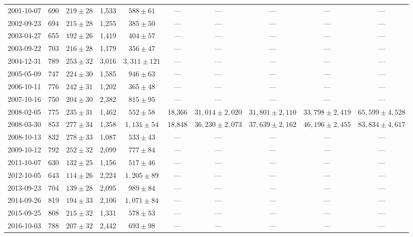 \begin{landscape}
\begin{longtable}{cccccccccc}
{2001-10-07} & 690 & {$219  \pm  28$} & 1,533 & {$588 \pm 61$} & --- & --- & --- & --- & --- \\
{2002-09-23} & 694 & {$215  \pm  28$} & 1,255 & {$385 \pm 50$} & --- & --- & --- & --- & --- \\
{2003-04-27} & 655 & {$192  \pm  26$} & 1,419 & {$404 \pm 57$} & --- & --- & --- & --- & --- \\
{2003-09-22} & 703 & {$216  \pm  28$} & 1,179 & {$356 \pm 47$} & --- & --- & --- & --- & --- \\
{2004-12-31} & 789 & {$253  \pm  32$} & 3,016 & {$3,311 \pm 121$} & --- & --- & --- & --- & --- \\
{2005-05-09} & 747 & {$224  \pm  30$} & 1,585 & {$946 \pm 63$} & --- & --- & --- & --- & --- \\
{2006-10-11} & 776 & {$242  \pm  31$} & 1,202 & {$365 \pm 48$} & --- & --- & --- & --- & --- \\
{2007-10-16} & 750 & {$204  \pm  30$} & 2,382 & {$815 \pm 95$} & --- & --- & --- & --- & --- \\
{2008-02-05} & 775 & {$235  \pm  31$} & 1,462 & {$552 \pm 58$} & 18,366 & {$31,014 \pm 2,020$} & {$31,801 \pm 2,110$} & {$33,798 \pm 2,419$} & {$65,599 \pm 4,528$} \\
{2008-03-30} & 853 & {$277  \pm  34$} & 1,358 & {$1,131 \pm 54$} & 18,848 & {$36,230 \pm 2,073$} & {$37,639 \pm 2,162$} & {$46,196 \pm 2,455$} & {$83,834 \pm 4,617$} \\
{2008-10-13} & 832 & {$278  \pm  33$} & 1,087 & {$533 \pm 43$} & --- & --- & --- & --- & --- \\
{2009-10-12} & 792 & {$252  \pm  32$} & 2,099 & {$777 \pm 84$} & --- & --- & --- & --- & --- \\
{2011-10-07} & 630 & {$132  \pm  25$} & 1,156 & {$517 \pm 46$} & --- & --- & --- & --- & --- \\
{2012-10-05} & 643 & {$114  \pm  26$} & 2,224 & {$1,205 \pm 89$} & --- & --- & --- & --- & --- \\
{2013-09-23} & 704 & {$139  \pm  28$} & 2,095 & {$989 \pm 84$} & --- & --- & --- & --- & --- \\
{2014-09-26} & 819 & {$194  \pm  33$} & 2,106 & {$1,071 \pm 84$} & --- & --- & --- & --- & --- \\
{2015-09-25} & 808 & {$215  \pm  32$} & 1,331 & {$578 \pm 53$} & --- & --- & --- & --- & --- \\
{2016-10-03} & 788 & {$207  \pm  32$} & 2,442 & {$693 \pm 98$} & --- & --- & --- & --- & --- \\
\end{longtable} 
\end{landscape} 
